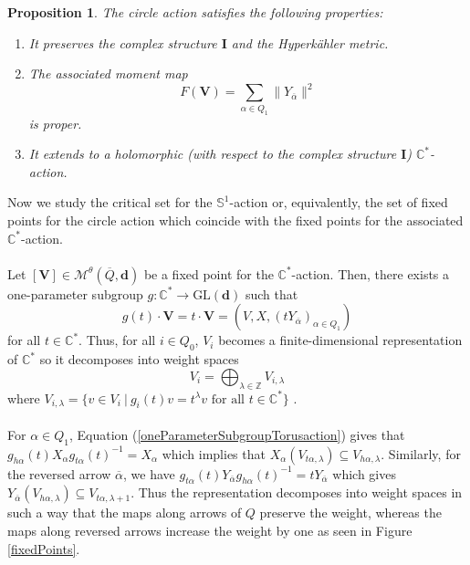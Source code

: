 \documentclass{amsart}
\theoremstyle{plain}
\newtheorem{proposition}[theorem]{Proposition}
\numberwithin{equation}{section}
\theoremstyle{definition}
\theoremstyle{remark}
\begin{document}
	\begin{proposition}  \cite[Theorem 5.1]{Nakajima} The circle action satisfies the following properties: 
		\begin{enumerate}
			\item It preserves the complex structure $\mathbf{I}$ and the Hyperkähler metric.
			\item The associated moment map 
			$$
			F(\mathbf{V})=\sum_{\alpha\in Q_1}\|Y_{\overline{\alpha}}\|^2
			$$
			is proper. 
			\item It extends to a holomorphic (with respect to the complex structure $\mathbf{I}$) $\mathbb{C}^*$-action.
		\end{enumerate}
	\end{proposition}
	Now we study the critical set for the $\mathbb{S}^1$-action or, equivalently, the set of fixed points for the circle action which coincide with the fixed points for the associated $\mathbb{C}^*$-action.
	\\
	\\
	Let $[\mathbf{V}]\in \mathcal{M}^{\theta}(\overline{Q},\mathbf{d})$ be a fixed point for the $\mathbb{C}^*$-action. Then, there exists a one-parameter subgroup $g:\mathbb{C}^*\to \text{GL}(\mathbf{d})$ such that 
	\begin{equation}\label{oneParameterSubgroupTorusaction}
		g(t)\cdot \mathbf{V} = t\cdot\mathbf{V}=(V,X,(tY_{\overline{\alpha}})_{\alpha\in Q_1})
	\end{equation}
	for all $t\in \mathbb{C}^*$. Thus, for all $i\in Q_0$, $V_i$ becomes a finite-dimensional representation of $\mathbb{C}^*$ so it decomposes into weight spaces
	$$V_i=\bigoplus_{\lambda\in \mathbb{Z}}V_{i,\lambda}$$
	where  $V_{i,\lambda}=\{v\in V_i\ |\ g_i(t)v=t^\lambda v\text{ for all }t\in\mathbb C^*\}$ \cite[Theorem 12.12]{MilneAlgebraicGroups}.
	\\
	\\
	For $\alpha\in Q_1$, Equation (\ref{oneParameterSubgroupTorusaction}) gives that
	$
	g_{h\alpha}(t)X_\alpha g_{t\alpha}(t)^{-1}
	=
	X_\alpha
	$
	which implies that
	$X_\alpha(V_{t\alpha,\lambda})
	\subseteq
	V_{h\alpha,\lambda}$. Similarly, for the reversed arrow $\overline\alpha$, we have
	$
	g_{t\alpha}(t)Y_{\overline\alpha}g_{h\alpha}(t)^{-1}
	=
	tY_{\overline\alpha}
	$
	which gives
	$
	Y_{\overline\alpha}(V_{h\alpha,\lambda})
	\subseteq
	V_{t\alpha,\lambda+1}.
	$
	Thus the representation decomposes into weight spaces in such a way that the
	maps along arrows of $Q$ preserve the weight, whereas the maps along reversed
	arrows increase the weight by one as seen in Figure \ref{fixedPoints}.
\end{document}
